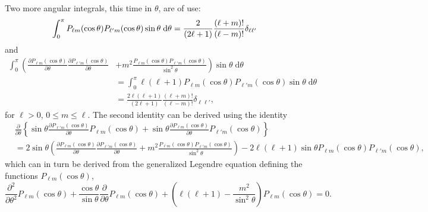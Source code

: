 \documentclass{article}
\begin{document}
Two more angular integrals, this time in $\theta$, are of use:
\begin{equation}
\int_0^\pi P_{\ell m}(\cos\theta)P_{\ell'm}(\cos\theta)\sin\theta\;\mathrm{d}\theta = \frac{2}{(2\ell + 1)}\frac{(\ell + m)!}{(\ell - m)!}\delta_{\ell\ell'}\\
\end{equation}
and
\begin{equation}
\begin{split}
\int_0^\pi\left(\frac{\partial P_{\ell m}(\cos\theta)}{\partial\theta}\frac{\partial P_{\ell'm}(\cos\theta)}{\partial\theta}\right. &+ \left.m^2\frac{P_{\ell m}(\cos\theta)P_{\ell'm}(\cos\theta)}{\sin^2\theta}\right)\sin\theta\;\mathrm{d}\theta\\
&= \int_0^\pi\ell(\ell + 1)P_{\ell m}(\cos\theta)P_{\ell'm}(\cos\theta)\sin\theta\;\mathrm{d}\theta\\
&= \frac{2\ell(\ell + 1)}{(2\ell + 1)}\frac{(\ell + m)!}{(\ell - m)!}\delta_{\ell\ell'},
\end{split}
\end{equation}
for $\ell > 0$, $0 \leq m \leq \ell$. The second identity can be derived using the identity
\begin{equation}
\begin{split}
&\frac{\partial}{\partial\theta}\left\{\sin\theta\frac{\partial P_{\ell'm}(\cos\theta)}{\partial\theta}P_{\ell m}(\cos\theta) + \sin\theta\frac{\partial P_{\ell m}(\cos\theta)}{\partial \theta}P_{\ell' m}(\cos\theta)\right\}\\
&= 2\sin\theta\left(\frac{\partial P_{\ell m}(\cos\theta)}{\partial\theta}\frac{\partial P_{\ell'm}(\cos\theta)}{\partial\theta} + m^2\frac{P_{\ell m}(\cos\theta)P_{\ell'm}(\cos\theta)}{\sin^2\theta}\right) - 2\ell(\ell + 1)\sin\theta P_{\ell m}(\cos\theta)P_{\ell' m}(\cos\theta),
\end{split}
\end{equation}
which can in turn be derived from the generalized Legendre equation defining the functions $P_{\ell m}(\cos\theta)$,
\begin{equation}
\frac{\partial^2}{\partial\theta^2}P_{\ell m}(\cos\theta) + \frac{\cos\theta}{\sin\theta}\frac{\partial}{\partial\theta}P_{\ell m}(\cos\theta) + \left(\ell(\ell + 1) - \frac{m^2}{\sin^2\theta}\right)P_{\ell m}(\cos\theta) = 0.
\end{equation}
\end{document}
